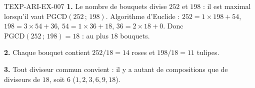 \begin{corrige}{TEXP-ARI-EX-007}
\textbf{1.} Le nombre de bouquets divise $252$ et $198$ : il est maximal
lorsqu'il vaut $\mathrm{PGCD}(252\,;\,198)$. Algorithme d'Euclide :
$252=1\times198+54$, $198=3\times54+36$, $54=1\times36+18$, $36=2\times18+0$.
Donc $\mathrm{PGCD}(252\,;\,198)=18$ : au plus $18$ bouquets.

\textbf{2.} Chaque bouquet contient $252/18=14$ roses et $198/18=11$ tulipes.

\textbf{3.} Tout diviseur commun convient : il y a autant de compositions que
de diviseurs de $18$, soit $6$ ($1,2,3,6,9,18$).
\end{corrige}
